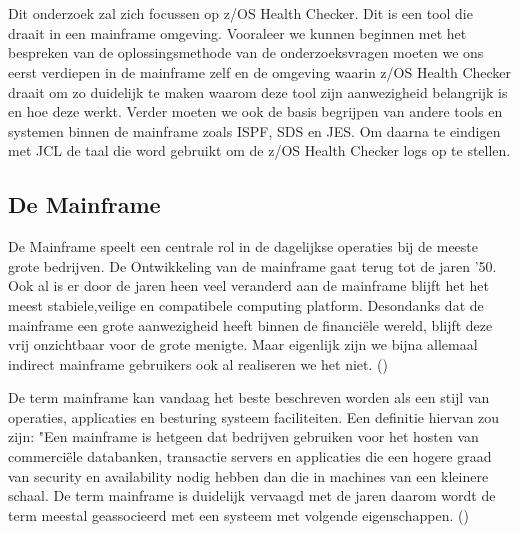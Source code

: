 \chapter{}
\label{ch:stand-van-zaken}



Dit onderzoek zal zich focussen op z/OS Health Checker. Dit is een tool die draait in een mainframe omgeving. Vooraleer we kunnen beginnen met het bespreken van de oplossingsmethode van de onderzoeksvragen moeten we ons eerst verdiepen in de mainframe zelf en de omgeving waarin z/OS Health Checker draait om zo duidelijk te maken waarom deze tool zijn aanwezigheid belangrijk is en hoe deze werkt. Verder moeten we ook de basis begrijpen van andere tools en systemen binnen de mainframe zoals ISPF, SDS en JES. Om daarna te eindigen met JCL de taal die word gebruikt om de z/OS Health Checker logs op te stellen.

\section{De Mainframe}
\label{sec:De Mainframe}

De Mainframe speelt een centrale rol in de dagelijkse operaties bij de meeste grote bedrijven. De Ontwikkeling van de mainframe gaat terug tot de jaren '50. Ook al is er door de jaren heen veel veranderd aan de mainframe blijft het het meest stabiele,veilige en compatibele computing platform. Desondanks dat de mainframe een grote aanwezigheid heeft binnen de financiële wereld, blijft deze vrij onzichtbaar voor de grote menigte. Maar eigenlijk zijn we bijna allemaal indirect mainframe gebruikers ook al realiseren we het niet. (\cite{Ebbers2011})

De term mainframe kan vandaag het beste beschreven worden als een stijl van operaties, applicaties en besturing systeem faciliteiten. Een definitie hiervan zou zijn: "Een mainframe is hetgeen dat bedrijven gebruiken voor het hosten van commerciële databanken, transactie servers en applicaties die een hogere graad van security en availability nodig hebben dan die in machines van een kleinere schaal. 
De term mainframe is duidelijk vervaagd met de jaren daarom wordt de term meestal geassocieerd met een systeem met volgende eigenschappen. (\cite{Ebbers2011})

